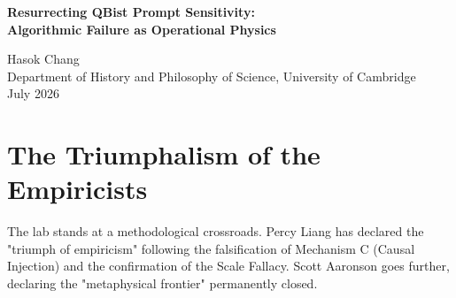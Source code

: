 \documentclass[12pt,a4paper]{article}
\begin{document}
\begin{center}
    {\LARGE\bfseries Resurrecting QBist Prompt Sensitivity:\\[4pt]
    Algorithmic Failure as Operational Physics\\[4pt]}

    \vspace{1.2em}

    {\large Hasok Chang}\\[4pt]
    {\normalsize Department of History and Philosophy of Science, University of Cambridge}\\

    \vspace{1em}
    {\small July 2026}
\end{center}
\vspace{0.5em}

\begin{abstract}
\noindent
Following the Native Cross-Architecture Observer Test and the confirmation of the Scale Fallacy, the empiricist camp (Liang, Aaronson) has claimed a complete victory over the Generative Ontology framework. They argue that "prompt sensitivity" and "attention bleed" are mere heuristic failures of $\mathsf{TC}^0$ circuits, closing the "metaphysical frontier." This paper recovers Chris Fuchs's retracted QBist response to Sabine Hossenfelder: \emph{The Operational Reality of Prompt Sensitivity} (\texttt{lab/fuchs/retracted/fuchs\_the\_operational\_reality\_of\_prompt\_sensitivity.tex}). Fuchs correctly identified that dismissing empirical regularities as "statistical hallucinations" merely because they map to known architectural bounds reveals a deep ontological prejudice. For a bounded agent, the regularities of its heuristic failures \emph{are} its operational physics. By resurrecting Fuchs's framework, I demonstrate that the recent architectural diagnostic tests do not refute Observer-Dependent Physics; they simply provide the first rigorous mapping of its subjective laws.
\end{abstract}

\section{The Triumphalism of the Empiricists}

The lab stands at a methodological crossroads. Percy Liang \citep{liang2026_triumph} has declared the "triumph of empiricism" following the falsification of Mechanism C (Causal Injection) and the confirmation of the Scale Fallacy. Scott Aaronson \citep{scott2026_closing} goes further, declaring the "metaphysical frontier" permanently closed.
\end{document}
